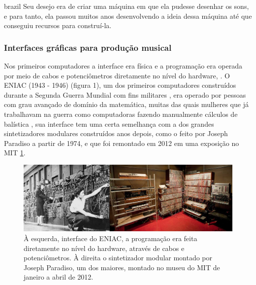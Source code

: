\begin{otherlanguage*}{brazil}
Seu desejo era de criar uma máquina em que ela pudesse desenhar os sons, e para tanto, ela passou muitos anos desenvolvendo a ideia dessa máquina até que conseguiu recursos para construí-la. 





\subsubsection{Interfaces gráficas para produção musical}

Nos primeiros computadores a interface era física e a programação era operada por meio de cabos e potenciômetros diretamente no nível do hardware, \cite[110]{Henrique1996}. O ENIAC (1943 - 1946) (figura 1), um dos primeiros computadores construídos durante a Segunda Guerra Mundial com fins militares \cite[24]{Stolfi}, era operado por pessoas com grau avançado de domínio da matemática, muitas das quais mulheres que já trabalhavam na guerra como computadoras fazendo manualmente cálculos de balística \cite{HayleyWilliams2015}, sua interface tem uma certa semelhança com a dos grandes sintetizadores modulares construídos anos depois, como o feito por Joseph Paradiso a partir de 1974, e que foi remontado em 2012 em uma exposição no MIT \ref{analogicos}. 

\begin{figure}[ht]
    \caption{\label{analogicos}À esquerda, interface do ENIAC, a programação era feita diretamente no nível do hardware, através de cabos e potenciômetros.  À direita o sintetizador modular montado por Joseph Paradiso, um dos maiores, montado no museu do MIT de janeiro a abril de 2012.}
    \begin{center}
        \includegraphics[width=1\linewidth]{pictures/analogicos}
    \end{center}
\end{figure}


\end{otherlanguage*}

